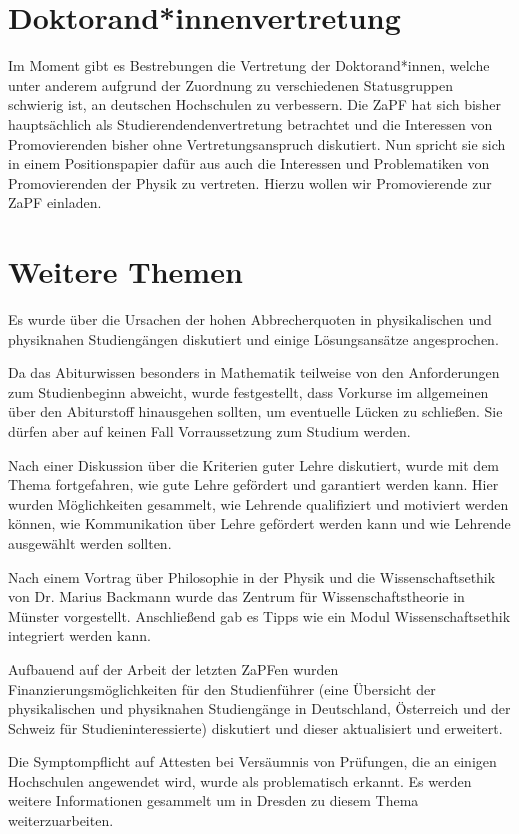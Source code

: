 \section*{Doktorand*innenvertretung}
Im Moment gibt es Bestrebungen die  Vertretung der Doktorand*innen, 
welche unter anderem aufgrund der Zuordnung zu verschiedenen Statusgruppen schwierig ist, 
an deutschen Hochschulen zu verbessern.  Die ZaPF hat sich bisher hauptsächlich als Studierendendenvertretung 
betrachtet und die Interessen von Promovierenden bisher ohne Vertretungsanspruch diskutiert. 
Nun spricht sie sich in einem Positionspapier dafür aus auch die Interessen 
und Problematiken von Promovierenden der Physik zu vertreten. 
Hierzu wollen wir Promovierende zur ZaPF einladen.



\section*{Weitere Themen}

Es wurde über die Ursachen der hohen Abbrecherquoten in physikalischen und 
physiknahen Studiengängen diskutiert und einige Lösungsansätze angesprochen.

Da das Abiturwissen besonders in Mathematik teilweise von den Anforderungen 
zum Studienbeginn abweicht, wurde festgestellt, dass Vorkurse im allgemeinen 
über den Abiturstoff hinausgehen sollten, um eventuelle Lücken zu schließen. 
Sie dürfen aber auf keinen Fall Vorraussetzung zum Studium werden.

Nach einer Diskussion über die Kriterien guter Lehre diskutiert, wurde mit dem 
Thema fortgefahren, wie gute Lehre gefördert und garantiert werden kann. 
Hier wurden Möglichkeiten gesammelt, wie Lehrende qualifiziert und motiviert werden können, 
wie Kommunikation über Lehre gefördert werden kann und wie Lehrende ausgewählt werden sollten.

Nach einem Vortrag über Philosophie in der Physik und die Wissenschaftsethik von Dr. Marius
Backmann wurde das Zentrum für Wissenschaftstheorie in Münster
vorgestellt. Anschließend gab es Tipps wie ein Modul Wissenschaftsethik integriert werden kann.

Aufbauend auf der Arbeit der letzten ZaPFen wurden Finanzierungsmöglichkeiten für den 
Studienführer (eine Übersicht der physikalischen und physiknahen Studiengänge in 
Deutschland, Österreich und der Schweiz für Studieninteressierte) diskutiert und dieser aktualisiert und erweitert.

Die Symptompflicht auf Attesten bei Versäumnis von Prüfungen, die an einigen Hochschulen 
angewendet wird, wurde als problematisch erkannt. Es werden weitere Informationen gesammelt um in Dresden zu diesem Thema weiterzuarbeiten.

